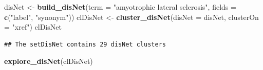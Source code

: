 \documentclass[9pt,a4paper,]{extarticle}
\newenvironment{Shaded}{\begin{snugshade}}{\end{snugshade}}
\newcommand{\DataTypeTok}[1]{\textcolor[rgb]{0.13,0.29,0.53}{#1}}
\newcommand{\KeywordTok}[1]{\textcolor[rgb]{0.13,0.29,0.53}{\textbf{#1}}}
\newcommand{\NormalTok}[1]{#1}
\newcommand{\StringTok}[1]{\textcolor[rgb]{0.31,0.60,0.02}{#1}}
\begin{document}
\begin{Shaded}
\begin{Highlighting}[]
\NormalTok{disNet <-}\StringTok{ }\KeywordTok{build_disNet}\NormalTok{(}\DataTypeTok{term =} \StringTok{"amyotrophic lateral sclerosis"}\NormalTok{, }
                       \DataTypeTok{fields =} \KeywordTok{c}\NormalTok{(}\StringTok{"label"}\NormalTok{, }\StringTok{"synonym"}\NormalTok{))}
\NormalTok{clDisNet <-}\StringTok{ }\KeywordTok{cluster_disNet}\NormalTok{(}\DataTypeTok{disNet =}\NormalTok{ disNet,}
                          \DataTypeTok{clusterOn =} \StringTok{"xref"}\NormalTok{)}
\NormalTok{clDisNet}
\end{Highlighting}
\end{Shaded}

\begin{verbatim}
## The setDisNet contains 29 disNet clusters
\end{verbatim}

\begin{Shaded}
\begin{Highlighting}[]
\KeywordTok{explore_disNet}\NormalTok{(clDisNet)}
\end{Highlighting}
\end{Shaded}
\end{document}
